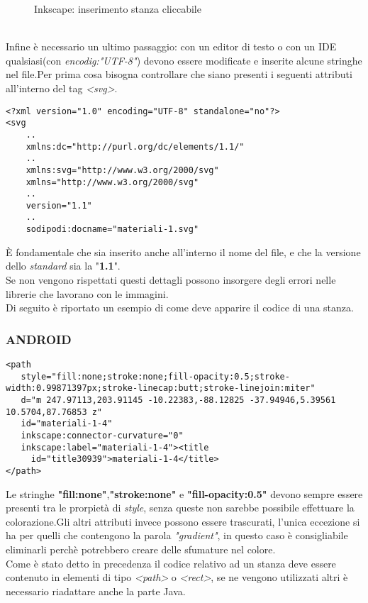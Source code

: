 \begin{figure}[H]
\centering
{}
\caption{Inkscape: inserimento stanza cliccabile}
\label{fig:TUT_ink}%
\end{figure}
\noindent\\Infine \`e necessario un ultimo passaggio: con un editor di testo o con un IDE qualsiasi(con \textit{encodig:"UTF-8"}) devono essere modificate e inserite alcune stringhe nel file.Per prima cosa bisogna controllare che siano presenti i seguenti attributi all'interno del tag \textit{<svg>}.
\begin{lstlisting}
<?xml version="1.0" encoding="UTF-8" standalone="no"?>
<svg
	..
	xmlns:dc="http://purl.org/dc/elements/1.1/"
	..
	xmlns:svg="http://www.w3.org/2000/svg"
	xmlns="http://www.w3.org/2000/svg"
	..
	version="1.1"
	..
	sodipodi:docname="materiali-1.svg"
\end{lstlisting}
\`E fondamentale che sia inserito anche all'interno il nome del file, e che la versione dello \textit{standard} sia la "\textbf{1.1}".\\Se non vengono rispettati questi dettagli possono insorgere degli errori nelle librerie che lavorano con le immagini.\\Di seguito \`e riportato un esempio di come deve apparire il codice di una stanza.
\subsubsection*{ANDROID}
\begin{lstlisting}
<path
   style="fill:none;stroke:none;fill-opacity:0.5;stroke-width:0.99871397px;stroke-linecap:butt;stroke-linejoin:miter"
   d="m 247.97113,203.91145 -10.22383,-88.12825 -37.94946,5.39561 10.5704,87.76853 z"
   id="materiali-1-4"
   inkscape:connector-curvature="0"
   inkscape:label="materiali-1-4"><title
     id="title30939">materiali-1-4</title>
</path>
\end{lstlisting}
Le stringhe \textbf{"fill:none"},\textbf{"stroke:none"} e \textbf{"fill-opacity:0.5"} devono sempre essere presenti tra le prorpiet\`a di \textit{style}, senza queste non sarebbe possibile effettuare la colorazione.Gli altri attributi invece possono essere trascurati, l'unica eccezione si ha per quelli che contengono la parola \textit{"gradient"}, in questo caso \`e consigliabile eliminarli perch\`e potrebbero creare delle sfumature nel colore.\\Come \`e stato detto in precedenza il codice relativo ad un stanza deve essere contenuto in elementi di tipo \textit{<path>} o \textit{<rect>}, se ne vengono utilizzati altri \`e necessario riadattare anche la parte Java.
